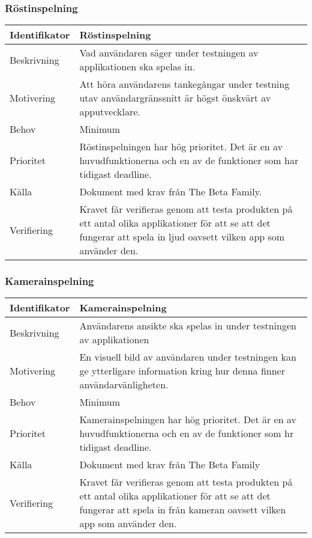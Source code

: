 \subsubsection{Röstinspelning}
\begin{tabular}{ | p{65pt} | p{300pt} |}
  \hline
  Identifikator &
Röstinspelning
  \\ \hline
  Beskrivning & 
  Vad användaren säger under testningen av applikationen ska spelas in.
  \\ \hline
  Motivering &
  Att höra användarens tankegångar under testning utav användargränssnitt är högst önskvärt av apputvecklare.
  \\ \hline
  Behov &
  Minimum
  \\ \hline
  Prioritet &
  Röstinspelningen har hög prioritet. Det är en av huvudfunktionerna och en av de funktioner som har tidigast deadline.
  \\ \hline
  Källa &
  Dokument med krav från The Beta Family.
  \\ \hline
  Verifiering &
  Kravet får verifieras genom att testa produkten på ett antal olika applikationer för att se att det fungerar att spela in ljud oavsett vilken app som använder den.
  \\ \hline
\end{tabular}

\subsubsection{Kamerainspelning}
\begin{tabular}{ | p{65pt} | p{300pt} |}
  \hline
  Identifikator &
  Kamerainspelning
  \\ \hline
  Beskrivning & 
  Användarens ansikte ska spelas in under testningen av applikationen
  \\ \hline
  Motivering &
  En visuell bild av användaren under testningen kan ge ytterligare information kring hur denna finner användarvänligheten.
  \\ \hline
  Behov &
  Minimum
  \\ \hline
  Prioritet &
  Kamerainspelningen har hög prioritet. Det är en av huvudfunktionerna och en av de funktioner som hr tidigast deadline.
  \\ \hline
  Källa &
  Dokument med krav från The Beta Family
  \\ \hline
  Verifiering &
  Kravet får verifieras genom att testa produkten på ett antal olika applikationer för att se att det fungerar att spela in från kameran oavsett vilken app som använder den.
  \\ \hline
\end{tabular}

